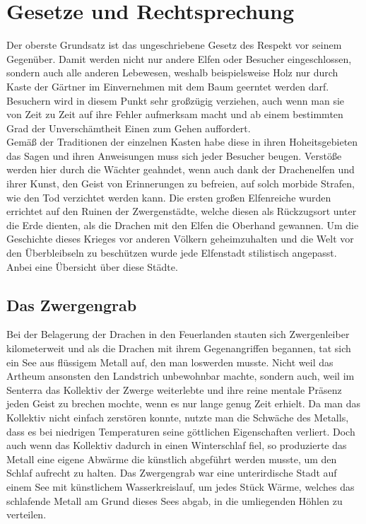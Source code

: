 \documentclass[a4paper,12pt,oneside]{book}
\begin{document}
\chapter{Gesetze und Rechtsprechung}
Der oberste Grundsatz ist das ungeschriebene Gesetz des Respekt vor seinem Gegenüber. Damit werden nicht nur andere Elfen oder Besucher eingeschlossen, sondern auch alle anderen Lebewesen, weshalb beispielsweise Holz nur durch Kaste der Gärtner im Einvernehmen mit dem Baum geerntet werden darf. Besuchern wird in diesem Punkt sehr großzügig verziehen, auch wenn man sie von Zeit zu Zeit auf ihre Fehler aufmerksam macht und ab einem bestimmten Grad der Unverschämtheit Einen zum Gehen auffordert. 
\\Gemäß der Traditionen der einzelnen Kasten habe diese in ihren Hoheitsgebieten das Sagen und ihren Anweisungen muss sich jeder Besucher beugen. Verstöße werden hier durch die Wächter geahndet, wenn auch dank der Drachenelfen und ihrer Kunst, den Geist von Erinnerungen zu befreien, auf solch morbide Strafen, wie den Tod verzichtet werden kann.
Die ersten großen Elfenreiche wurden errichtet auf den Ruinen der Zwergenstädte, welche diesen als Rückzugsort unter die Erde dienten, als die Drachen mit den Elfen die Oberhand gewannen. Um die Geschichte dieses Krieges vor anderen Völkern geheimzuhalten und die Welt vor den Überbleibseln zu beschützen wurde jede Elfenstadt stilistisch angepasst. Anbei eine Übersicht über diese Städte.
\section{Das Zwergengrab}
Bei der Belagerung der Drachen in den Feuerlanden stauten sich Zwergenleiber kilometerweit und als die Drachen mit ihrem Gegenangriffen begannen, tat sich ein See aus flüssigem Metall auf, den man loswerden musste. Nicht weil das Artheum ansonsten den Landstrich unbewohnbar machte, sondern auch, weil im Senterra das Kollektiv der Zwerge weiterlebte und ihre reine mentale Präsenz jeden Geist zu brechen mochte, wenn es nur lange genug Zeit erhielt. Da man das Kollektiv nicht einfach zerstören konnte, nutzte man die Schwäche des Metalls, dass es bei niedrigen Temperaturen seine göttlichen Eigenschaften verliert. Doch auch wenn das Kollektiv dadurch in einen Winterschlaf fiel, so produzierte das Metall eine eigene Abwärme die künstlich abgeführt werden musste, um den Schlaf aufrecht zu halten. Das Zwergengrab war eine unterirdische Stadt auf einem See mit künstlichem Wasserkreislauf, um jedes Stück Wärme, welches das schlafende Metall am Grund dieses Sees abgab, in die umliegenden Höhlen zu verteilen.
\end{document}
